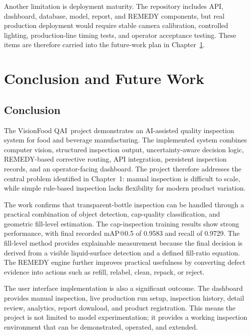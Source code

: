 \documentclass[12pt,a4paper]{report}
\newcommand{\shorttitle}{VisionFood QAI}
\begin{document}
Another limitation is deployment maturity. The repository includes API, dashboard, database, model, report, and REMEDY components, but real production deployment would require stable camera calibration, controlled lighting, production-line timing tests, and operator acceptance testing. These items are therefore carried into the future-work plan in Chapter~\ref{ch:conclusion-future-work}.

\chapter{Conclusion and Future Work}
\label{ch:conclusion-future-work}

\section{Conclusion}
\label{sec:conclusion}

The \shorttitle\ project demonstrates an AI-assisted quality inspection system for food and beverage manufacturing. The implemented system combines computer vision, structured inspection output, uncertainty-aware decision logic, REMEDY-based corrective routing, API integration, persistent inspection records, and an operator-facing dashboard. The project therefore addresses the central problem identified in Chapter~1: manual inspection is difficult to scale, while simple rule-based inspection lacks flexibility for modern product variation.

The work confirms that transparent-bottle inspection can be handled through a practical combination of object detection, cap-quality classification, and geometric fill-level estimation. The cap-inspection training results show strong performance, with final recorded mAP@0.5 of 0.9583 and recall of 0.9729. The fill-level method provides explainable measurement because the final decision is derived from a visible liquid-surface detection and a defined fill-ratio equation. The REMEDY engine further improves practical usefulness by converting defect evidence into actions such as refill, relabel, clean, repack, or reject.

The user interface implementation is also a significant outcome. The dashboard provides manual inspection, live production run setup, inspection history, detail review, analytics, report download, and product registration. This means the project is not limited to model experimentation; it provides a working inspection environment that can be demonstrated, operated, and extended.
\end{document}
